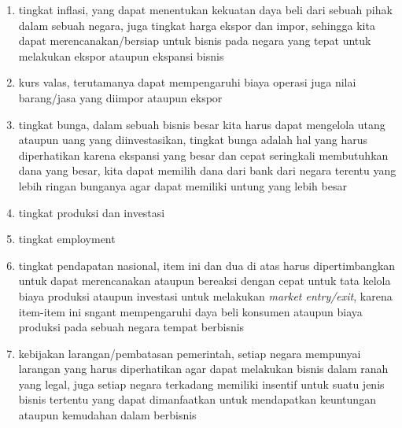 \documentclass{article}
\begin{document}
\begin{enumerate}
    \item tingkat inflasi, yang dapat menentukan kekuatan daya beli dari sebuah 
    pihak dalam sebuah negara, 
    juga tingkat harga ekspor dan impor, 
    sehingga kita dapat merencanakan/bersiap untuk bisnis pada negara  
    yang tepat untuk melakukan ekspor ataupun ekspansi bisnis
    \item kurs valas, terutamanya dapat mempengaruhi biaya operasi juga nilai barang/jasa yang diimpor ataupun ekspor
    \item tingkat bunga, dalam sebuah bisnis besar kita harus dapat mengelola utang ataupun uang yang diinvestasikan, tingkat bunga adalah hal yang harus diperhatikan karena ekspansi yang besar dan cepat seringkali membutuhkan dana yang besar, 
    kita dapat memilih dana dari bank dari negara terentu yang lebih ringan bunganya agar dapat memiliki untung yang lebih besar
    \item tingkat produksi dan investasi
    \item tingkat employment
    \item tingkat pendapatan nasional, 
    item ini dan dua di atas harus dipertimbangkan 
    untuk dapat merencanakan ataupun bereaksi dengan cepat 
    untuk tata kelola biaya produksi ataupun investasi untuk melakukan \emph{market entry/exit}, karena item-item ini sngant mempengaruhi daya beli konsumen ataupun biaya produksi pada sebuah negara tempat berbisnis 
    \item kebijakan larangan/pembatasan pemerintah, 
    setiap negara mempunyai larangan yang harus diperhatikan agar dapat melakukan bisnis dalam ranah yang legal, juga setiap negara terkadang memiliki insentif untuk suatu jenis bisnis tertentu yang dapat dimanfaatkan untuk mendapatkan keuntungan ataupun kemudahan dalam berbisnis
\end{enumerate}
\end{document}
